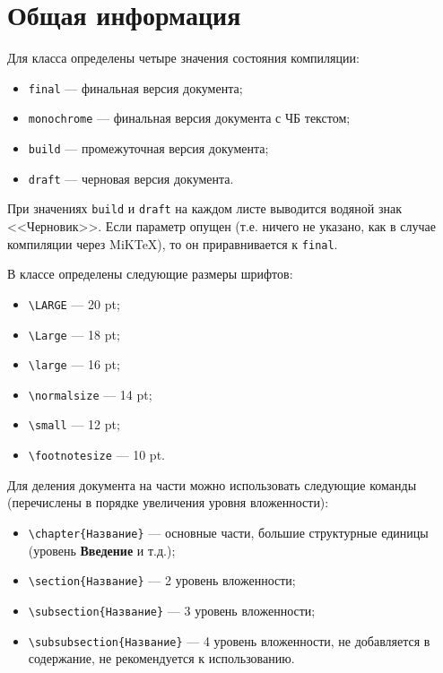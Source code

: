 \chapter{Общая информация}

Для класса определены четыре значения состояния компиляции:
\begin{itemize}
    \item \lstinline:final: --- финальная версия документа;
    \item \lstinline:monochrome: --- финальная версия документа с ЧБ текстом;
    \item \lstinline:build: --- промежуточная версия документа;
    \item \lstinline:draft: --- черновая версия документа.
\end{itemize}

При значениях \lstinline:build: и \lstinline:draft: на каждом листе выводится водяной знак
<<Черновик>>. Если параметр опущен (т.е. ничего не указано, как в случае
компиляции через MiKTeX), то он приравнивается к \lstinline:final:.

В классе определены следующие размеры шрифтов:
\begin{itemize}
    \item \lstinline:\LARGE: --- 20 pt;
    \item \lstinline:\Large: --- 18 pt;
    \item \lstinline:\large: --- 16 pt;
    \item \lstinline:\normalsize: --- 14 pt;
    \item \lstinline:\small: --- 12 pt;
    \item \lstinline:\footnotesize: --- 10 pt.
\end{itemize}

Для деления документа на части можно использовать следующие команды (перечислены
в порядке увеличения уровня вложенности):

\begin{itemize}
    \item \lstinline:\chapter{Название}: --- основные части, большие структурные единицы
    (уровень \textbf{Введение} и т.д.);
    \item \lstinline:\section{Название}: --- 2 уровень вложенности;
    \item \lstinline:\subsection{Название}: --- 3 уровень вложенности;
    \item \lstinline:\subsubsection{Название}: --- 4 уровень вложенности, не добавляется в
    содержание, не рекомендуется к использованию.
\end{itemize}

